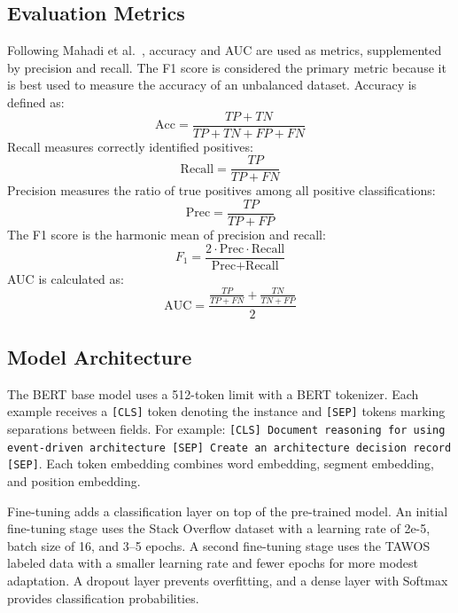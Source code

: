\documentclass[preprint,12pt]{elsarticle}
\begin{document}
\subsection{Evaluation Metrics}

Following Mahadi et al.~\cite{mahadi2021}, accuracy and AUC are used as metrics, supplemented by precision and recall. The F1 score is considered the primary metric because it is best used to measure the accuracy of an unbalanced dataset. Accuracy is defined as:
\begin{equation}
\text{Acc} = \frac{TP + TN}{TP + TN + FP + FN}
\label{eq:acc}
\end{equation}
Recall measures correctly identified positives:
\begin{equation}
\text{Recall} = \frac{TP}{TP + FN}
\label{eq:recall}
\end{equation}
Precision measures the ratio of true positives among all positive classifications:
\begin{equation}
\text{Prec} = \frac{TP}{TP + FP}
\label{eq:prec}
\end{equation}
The F1 score is the harmonic mean of precision and recall:
\begin{equation}
F_1 = \frac{2 \cdot \text{Prec} \cdot \text{Recall}}{\text{Prec} + \text{Recall}}
\label{eq:f1}
\end{equation}
AUC is calculated as:
\begin{equation}
\text{AUC} = \frac{\frac{TP}{TP+FN} + \frac{TN}{TN+FP}}{2}
\label{eq:auc}
\end{equation}

\subsection{Model Architecture}

The BERT base model uses a 512-token limit with a BERT tokenizer. Each example receives a \texttt{[CLS]} token denoting the instance and \texttt{[SEP]} tokens marking separations between fields. For example: \texttt{[CLS] Document reasoning for using event-driven architecture [SEP] Create an architecture decision record [SEP]}. Each token embedding combines word embedding, segment embedding, and position embedding.

Fine-tuning adds a classification layer on top of the pre-trained model. An initial fine-tuning stage uses the Stack Overflow dataset with a learning rate of 2e-5, batch size of 16, and 3--5 epochs. A second fine-tuning stage uses the TAWOS labeled data with a smaller learning rate and fewer epochs for more modest adaptation. A dropout layer prevents overfitting, and a dense layer with Softmax provides classification probabilities.
\end{document}
